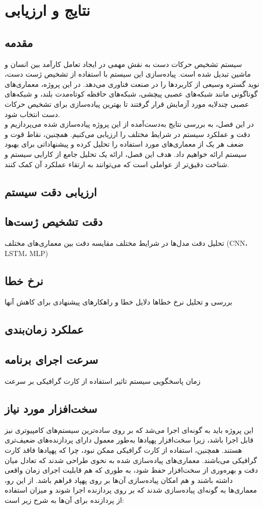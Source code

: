 \chapter{نتایج و ارزیابی}
\section{مقدمه}
سیستم تشخیص حرکات دست به نقش مهمی در ایجاد تعامل کارآمد بین انسان و ماشین تبدیل شده است. پیاده‌سازی این سیستم با استفاده از تشخیص ژست دست، نوید گستره وسیعی از کاربردها را در صنعت فناوری می‌دهد. در این پروژه، 
معماری‌های گوناگونی مانند شبکه‌های عصبی پیچشی، شبکه‌های حافظه کوتاه‌مدت بلند، و شبکه‌های عصبی چندلایه مورد آزمایش قرار گرفتند تا بهترین پیاده‌سازی برای تشخیص حرکات دست انتخاب شود. 
\\
در این فصل، به بررسی نتایج به‌دست‌آمده از این پروژه پیاده‌سازی شده می‌پردازیم و دقت و عملکرد سیستم در شرایط مختلف را ارزیابی می‌کنیم. همچنین، نقاط قوت و ضعف هر یک از معماری‌های مورد استفاده 
را تحلیل کرده و پیشنهاداتی برای بهبود سیستم ارائه خواهیم داد. هدف این فصل، ارائه یک تحلیل جامع از کارایی سیستم و شناخت دقیق‌تر از عواملی است که می‌توانند به ارتقاء عملکرد آن کمک کنند.


\section{ارزیابی دقت سیستم}

\section{دقت تشخیص ژست‌ها}
تحلیل دقت مدل‌ها در شرایط مختلف
مقایسه دقت بین معماری‌های مختلف (CNN، LSTM، MLP)

\section{نرخ خطا}
بررسی و تحلیل نرخ خطاها
دلایل خطا و راهکارهای پیشنهادی برای کاهش آنها


\section{عملکرد زمان‌بندی}


\section{سرعت اجرای برنامه}
زمان پاسخگویی سیستم
تاثیر استفاده از کارت گرافیکی بر سرعت

\section{سخت‌افزار مورد نیاز}
این پروژه باید به گونه‌ای اجرا می‌شد که بر روی ساده‌ترین سیستم‌های کامپیوتری نیز قابل اجرا باشد، زیرا سخت‌افزار پهپادها به‌طور معمول دارای پردازنده‌های ضعیف‌تری هستند. همچنین، استفاده از کارت گرافیکی ممکن نبود، چرا که 
پهپادها فاقد کارت گرافیکی می‌باشند. معماری‌های پیاده‌سازی شده به نحوی طراحی شدند که تعادل میان دقت و بهره‌وری از سخت‌افزار حفظ شود، به طوری که هم قابلیت اجرای زمان واقعی داشته باشند و هم امکان پیاده‌سازی آن‌ها بر روی پهپاد 
فراهم باشد. از این رو، معماری‌ها به گونه‌ای پیاده‌سازی شدند که بر روی پردازنده اجرا شوند و میزان استفاده از پردازنده برای آن‌ها به شرح زیر است:


